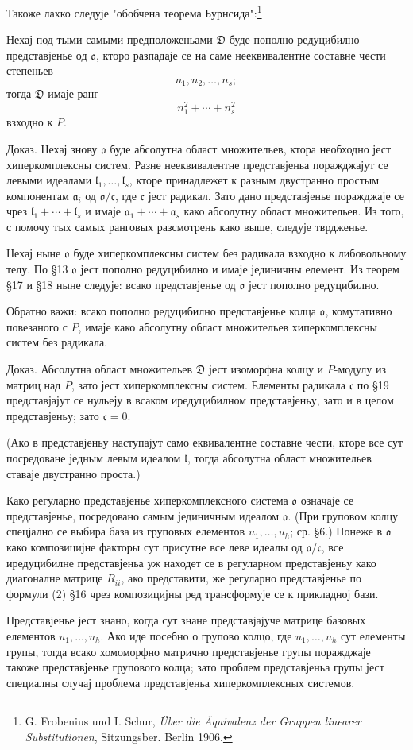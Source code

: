 ﻿\documentclass[11pt]{article}
\providecommand{\mo}{\mathfrak{o}}
\providecommand{\ma}{\mathfrak{a}}
\providecommand{\ml}{\mathfrak{l}}
\providecommand{\mc}{\mathfrak{c}}
\providecommand{\mD}{\mathfrak{D}}
\begin{document}
Такоже лахко следује "обобчена теорема Бурнсида":\footnote{G. Frobenius und I. Schur, \emph{Über die Äquivalenz der Gruppen linearer Substitutionen}, Sitzungsber. Berlin 1906.}

Нехај под тыми самыми предположеньами $\mD$ буде пополно редуцибилно представјенье од $\mo$, кторо разпадаје се на саме нееквивалентне составне чести степеньев
\[
        n_1,n_2,\ldots,n_s;
\]
тогда $\mD$ имаје ранг
\[
        n_1^2+\cdots+n_s^2
\]
взходно к $P$.

Доказ. Нехај знову $\mo$ буде абсолутна област множительев, ктора необходно јест хиперкомплексны систем. Разне нееквивалентне представјеньа поражджајут се левыми идеалами $\ml_1,\ldots,\ml_s$, кторе принадлежет к разным двустранно простым компонентам $\ma_i$ од $\mo/\mc$, где $\mc$ јест радикал. Зато дано представјенье поражджаје се чрез $\ml_1+\cdots+\ml_s$ и имаје $\ma_1+\cdots+\ma_s$ како абсолутну област множительев. Из того, с помочу тых самых ранговых разсмотрень како выше, следује тврдженье.

Нехај ныне $\mo$ буде хиперкомплексны систем без радикала взходно к либовольному телу. По §13 $\mo$ јест пополно редуцибилно и имаје јединичны елемент. Из теорем §17 и §18 ныне следује: всако представјенье од $\mo$ јест пополно редуцибилно.

Обратно важи: всако пополно редуцибилно представјенье колца $\mo$, комутативно повезаного с $P$, имаје како абсолутну област множительев хиперкомплексны систем без радикала.

Доказ. Абсолутна област множительев $\mD$ јест изоморфна колцу и $P$-модулу из матриц над $P$, зато јест хиперкомплексны систем. Елементы радикала $\mc$ по §19 представјајут се нульеју в всаком иредуцибилном представјеньу, зато и в целом представјеньу; зато $\mc=0$.

(Ако в представјеньу наступајут само еквивалентне составне чести, кторе все сут посредоване једным левым идеалом $\ml$, тогда абсолутна област множительев ставаје двустранно проста.)

Како регуларно представјенье хиперкомплексного система $\mo$ означаје се представјенье, посредовано самым јединичным идеалом $\mo$. (При груповом колцу спецјално се выбира база из груповых елементов $u_1,\ldots,u_h$; ср. §6.) Понеже в $\mo$ како композицијне факторы сут присутне все леве идеалы од $\mo/\mc$, все иредуцибилне представјеньа уж находет се в регуларном представјеньу како диагоналне матрице $R_{ii}$, ако представити, же регуларно представјенье по формули (2) §16 чрез композицијны ред трансформује се к прикладној бази.

Представјенье јест знано, когда сут знане представјајуче матрице базовых елементов $u_1,\ldots,u_h$. Ако иде посебно о групово колцо, где $u_1,\ldots,u_h$ сут елементы групы, тогда всако хомоморфно матрично представјенье групы поражджаје такоже представјенье групового колца; зато проблем представјеньа групы јест специалны случај проблема представјеньа хиперкомплексных системов.
\end{document}
